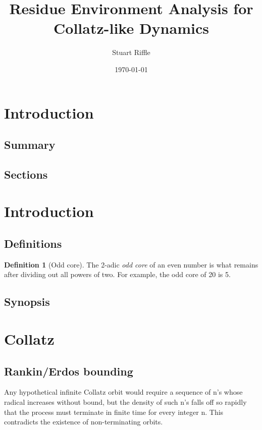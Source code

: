 \documentclass[12pt]{article}
\title{Residue Environment Analysis for Collatz-like Dynamics}
\author{Stuart Riffle}
\date{\today}
\theoremstyle{plain}
\theoremstyle{definition}
\newtheorem{definition}[theorem]{Definition}
\begin{document}
\maketitle
\begin{abstract}
\end{abstract}

\section{Introduction}
    \subsection{Summary}
    \subsection{Sections}

\section{Introduction}
    \subsection{Definitions}
        \begin{definition}[Odd core]
        The 2-adic \emph{odd core} of an even number is what remains after dividing out all powers of two. For example, the odd core of 20 is 5.
        \end{definition}





    \subsection{Synopsis}

\section{Collatz}
    \subsection{Rankin/Erdos bounding}
    Any hypothetical infinite Collatz orbit would require a sequence of n’s whose radical increases without bound, but the density of such n’s falls off so rapidly that the process must terminate in finite time for every integer n. This contradicts the existence of non-terminating orbits.
\end{document}
